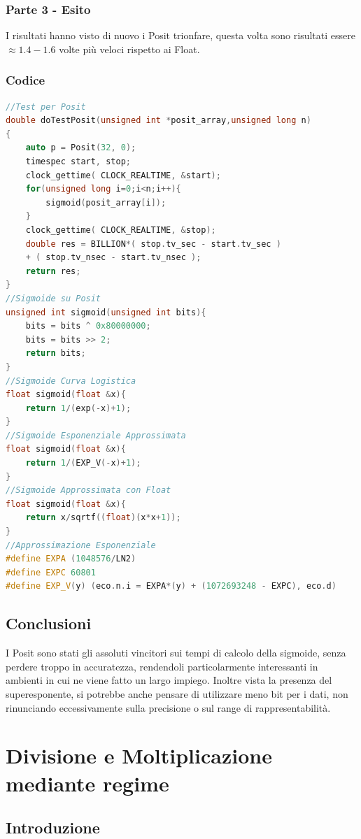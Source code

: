 \documentclass[a4paper,11pt]{article}
\begin{document}
\subsubsection{Parte 3 - Esito}

I risultati hanno visto di nuovo i Posit trionfare, questa volta sono risultati essere $\approx1.4-1.6$ volte più veloci rispetto ai Float.
\newpage
\subsubsection{Codice}
\begin{lstlisting}[language=C++]
//Test per Posit
double doTestPosit(unsigned int *posit_array,unsigned long n)
{
	auto p = Posit(32, 0);
	timespec start, stop;
	clock_gettime( CLOCK_REALTIME, &start);
	for(unsigned long i=0;i<n;i++){
		sigmoid(posit_array[i]);	
	}
	clock_gettime( CLOCK_REALTIME, &stop);
	double res = BILLION*( stop.tv_sec - start.tv_sec ) 
	+ ( stop.tv_nsec - start.tv_nsec ); 
	return res;
}
//Sigmoide su Posit
unsigned int sigmoid(unsigned int bits){
	bits = bits ^ 0x80000000;
	bits = bits >> 2;
	return bits;
}
//Sigmoide Curva Logistica
float sigmoid(float &x){
	return 1/(exp(-x)+1);
}
//Sigmoide Esponenziale Approssimata
float sigmoid(float &x){
	return 1/(EXP_V(-x)+1);
}
//Sigmoide Approssimata con Float
float sigmoid(float &x){
	return x/sqrtf((float)(x*x+1));
}
//Approssimazione Esponenziale
#define EXPA (1048576/LN2) 		
#define EXPC 60801 			
#define EXP_V(y) (eco.n.i = EXPA*(y) + (1072693248 - EXPC), eco.d)

\end{lstlisting}
\newpage
\subsection{Conclusioni}
I Posit sono stati gli assoluti vincitori sui tempi di calcolo della sigmoide, senza perdere troppo in accuratezza, rendendoli particolarmente interessanti in ambienti in cui ne viene fatto un largo impiego. Inoltre vista la presenza del superesponente, si potrebbe anche pensare di utilizzare meno bit per i dati, non rinunciando eccessivamente sulla precisione o sul range di rappresentabilità.


\newpage
\section{Divisione e Moltiplicazione mediante regime}
\subsection{Introduzione}
\end{document}
